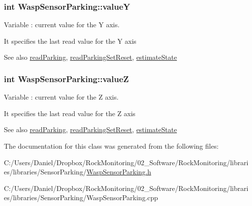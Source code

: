 \subsubsection[{\texorpdfstring{valueY}{valueY}}]{\setlength{\rightskip}{0pt plus 5cm}int Wasp\+Sensor\+Parking\+::valueY}\hypertarget{class_wasp_sensor_parking_af1a5efe0c7270b33888039e4a26855b0}{}\label{class_wasp_sensor_parking_af1a5efe0c7270b33888039e4a26855b0}


Variable \+: current value for the Y axis. 

It specifies the last read value for the Y axis \begin{DoxySeeAlso}{See also}
\hyperlink{class_wasp_sensor_parking_a495a2b26ed6620d327b7cd902696f533}{read\+Parking}, \hyperlink{class_wasp_sensor_parking_a8a3311a8d14d5538f2b42cba5c2cc8e0}{read\+Parking\+Set\+Reset}, \hyperlink{class_wasp_sensor_parking_a5635382fc068370a3b561c94dccbb283}{estimate\+State} 
\end{DoxySeeAlso}
\subsubsection[{\texorpdfstring{valueZ}{valueZ}}]{\setlength{\rightskip}{0pt plus 5cm}int Wasp\+Sensor\+Parking\+::valueZ}\hypertarget{class_wasp_sensor_parking_aa6a6cc9de9a74e3658270d7db127539c}{}\label{class_wasp_sensor_parking_aa6a6cc9de9a74e3658270d7db127539c}


Variable \+: current value for the Z axis. 

It specifies the last read value for the Z axis \begin{DoxySeeAlso}{See also}
\hyperlink{class_wasp_sensor_parking_a495a2b26ed6620d327b7cd902696f533}{read\+Parking}, \hyperlink{class_wasp_sensor_parking_a8a3311a8d14d5538f2b42cba5c2cc8e0}{read\+Parking\+Set\+Reset}, \hyperlink{class_wasp_sensor_parking_a5635382fc068370a3b561c94dccbb283}{estimate\+State} 
\end{DoxySeeAlso}


The documentation for this class was generated from the following files\+:\begin{DoxyCompactItemize}
\item 
C\+:/\+Users/\+Daniel/\+Dropbox/\+Rock\+Monitoring/02\+\_\+\+Software/\+Rock\+Monitoring/libraries/libraries/\+Sensor\+Parking/\hyperlink{_wasp_sensor_parking_8h}{Wasp\+Sensor\+Parking.\+h}\item 
C\+:/\+Users/\+Daniel/\+Dropbox/\+Rock\+Monitoring/02\+\_\+\+Software/\+Rock\+Monitoring/libraries/libraries/\+Sensor\+Parking/Wasp\+Sensor\+Parking.\+cpp\end{DoxyCompactItemize}
